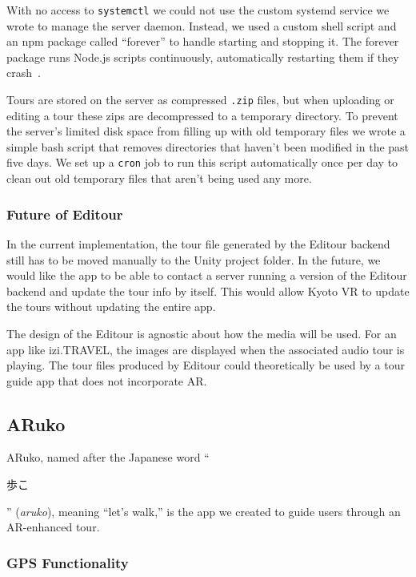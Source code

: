 \documentclass[a4paper, 10pt, american, titlepage]{article}
\begin{document}
With no access to \texttt{systemctl} we could not use the custom systemd service
we wrote to manage the server daemon. Instead, we used a custom shell script and
an npm package called ``forever'' to handle starting and stopping it. The
forever package runs Node.js scripts continuously, automatically restarting them
if they crash~\autocite{robbins2019}.

Tours are stored on the server as compressed \texttt{.zip} files, but when
uploading or editing a tour these zips are decompressed to a temporary
directory. To prevent the server's limited disk space from filling up with old
temporary files we wrote a simple bash script that removes directories that
haven't been modified in the past five days. We set up a \texttt{cron} job to
run this script automatically once per day to clean out old temporary files that
aren't being used any more.

\subsubsection{Future of Editour}
\label{sec:futureOfEditour}

In the current implementation, the tour file generated by the Editour backend
still has to be moved manually to the Unity project folder. In the future, we
would like the app to be able to contact a server running a version of the
Editour backend and update the tour info by itself. This would allow Kyoto VR
to update the tours without updating the entire app.

The design of the Editour is agnostic about how the media will be used. For an
app like izi.TRAVEL, the images are displayed when the associated audio tour is
playing. The tour files produced by Editour could theoretically be used by a
tour guide app that does not incorporate AR.

\subsection{ARuko}
\label{sec:aruko}

ARuko, named after the Japanese word ``\begin{CJK}{UTF8}{min}歩こ\end{CJK}''
(\textit{aruko}), meaning ``let's walk,'' is the app we created to guide users
through an AR-enhanced tour.

\subsubsection{GPS Functionality}
\label{sec:gpsFunctionality}
\end{document}
